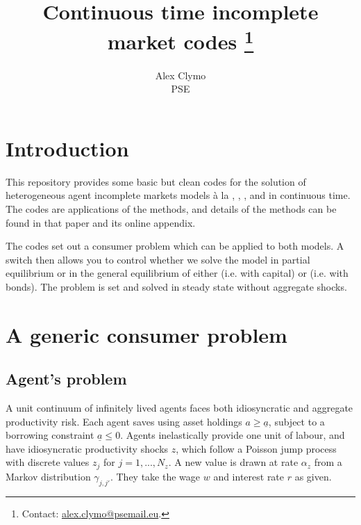 \documentclass[11pt,english]{article}
\title{Continuous time incomplete market codes \thanks{\noindent \hspace*{-2em} %
Contact: \url{alex.clymo@psemail.eu}. 
}}
\author{Alex Clymo \\ PSE}
\begin{document}
\maketitle



\onehalfspacing

\vspace{-1cm}

\section{Introduction} 
\label{sec:introduction} 

This repository provides some basic but clean codes for the solution of heterogeneous agent incomplete markets models à la \cite{BewleyStationary1986}, \cite{ImrohorogluCost1989}, \cite{HuggettRiskfree1993}, and \cite{AiyagariUninsured1994} in continuous time. The codes are applications of the \cite{AchdouEtAlIncome2022} methods, and details of the methods can be found in that paper and its online appendix. 

The codes set out a consumer problem which can be applied to both models. A switch then allows you to control whether we solve the model in partial equilibrium or in the general equilibrium of either \cite{AiyagariUninsured1994} (i.e. with capital) or \cite{HuggettRiskfree1993} (i.e. with bonds). The problem is set and solved in steady state without aggregate shocks. 


\section{A generic consumer problem}

\subsection{Agent's problem}

A unit continuum of infinitely lived agents faces both idiosyncratic and aggregate productivity risk. Each agent saves using asset holdings \( a \geq \underline{a} \), subject to a borrowing constraint $\underline{a} \leq 0$. Agents inelastically provide one unit of labour, and have idiosyncratic productivity shocks \( z \), which follow a Poisson jump process with discrete values $z_j$ for $j=1,...,N_z$. A new value is drawn at rate $\alpha_z$ from a Markov distribution $\gamma_{j,j'}$. They take the wage $w$ and interest rate $r$ as given. 
\end{document}
